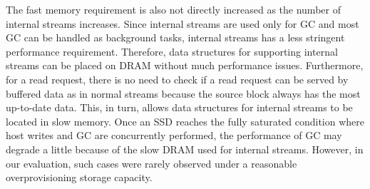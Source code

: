 The fast memory requirement is also not directly increased as the number 
of internal streams increases.   
Since internal streams are used only for GC and most GC can be handled as background tasks,
internal streams has a less stringent performance requirement.  
Therefore, data structures for supporting internal streams can be placed 
on DRAM without much performance issues.  
Furthermore, for a read request, there is no need to check if a read request 
can be served by buffered data as in normal streams because the source block always 
has the most up-to-date data.  
This, in turn, allows data structures for internal streams to be located in slow memory.
Once an SSD reaches the fully saturated condition where host writes and GC 
are concurrently performed, the performance of GC may degrade a little because of
the slow DRAM used for internal streams.   
However, in our evaluation, such cases were rarely observed under a 
reasonable overprovisioning storage capacity.

